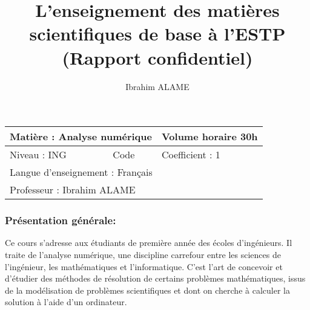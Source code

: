 \documentclass{article}
\author{
  Ibrahim ALAME
}
\title{L'enseignement des matières scientifiques de base à l'ESTP\\
       \small (Rapport confidentiel) }
\begin{document}




\noindent 
\begin{tabular}{|l|l|l|}
   \hline
   \multicolumn{2}{|l|}{Matière  : \hspace{1cm} Analyse numérique\hspace{7cm} } & Volume horaire 30h\\
   \hline
   Niveau : ING& Code & Coefficient : 1 \\
   \hline
   \multicolumn{3}{|l|}{ Langue d'enseignement : Français }\\
   \hline
    \multicolumn{3}{|l|}{ Professeur : Ibrahim ALAME }\\
   \hline
\end{tabular}

\subsubsection*{Présentation générale:}
Ce cours s'adresse aux étudiants de première année des écoles d'ingénieurs. Il traite de l'analyse numérique, une discipline carrefour entre les sciences de l'ingénieur, les mathématiques et l'informatique. C'est l'art de concevoir et d'étudier des méthodes de résolution de certains problèmes mathématiques,  issus de la modélisation de problèmes scientifiques et dont on cherche à calculer la solution à l'aide d'un ordinateur.
\end{document}
